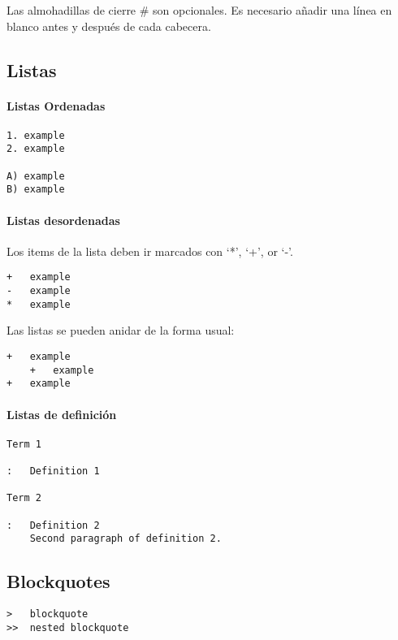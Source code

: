 \documentclass[12pt,spanish,]{article}
\let\oldparagraph\paragraph
\renewcommand{\paragraph}[1]{\oldparagraph{#1}\mbox{}}
\begin{document}
Las almohadillas de cierre \# son opcionales. Es necesario añadir una
línea en blanco antes y después de cada cabecera.

\subsection{Listas}\label{listas}

\paragraph{Listas Ordenadas}\label{listas-ordenadas}

\begin{verbatim}
1. example
2. example

A) example
B) example
\end{verbatim}

\paragraph{Listas desordenadas}\label{listas-desordenadas}

Los items de la lista deben ir marcados con `*', `+', or `-'.

\begin{verbatim}
+   example
-   example
*   example
\end{verbatim}

Las listas se pueden anidar de la forma usual:

\begin{verbatim}
+   example
    +   example
+   example
\end{verbatim}

\paragraph{Listas de definición}\label{listas-de-definiciuxf3n}

\begin{verbatim}
Term 1

:   Definition 1

Term 2

:   Definition 2
    Second paragraph of definition 2.
\end{verbatim}

\subsection{Blockquotes}\label{blockquotes}

\begin{verbatim}
>   blockquote
>>  nested blockquote
\end{verbatim}
\end{document}
